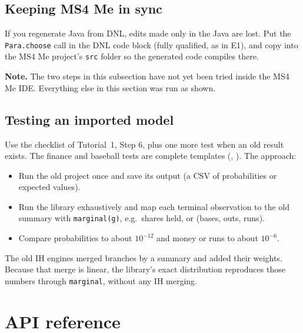 \documentclass[11pt]{article}
\newcommand{\code}[1]{\texttt{#1}}
\newcommand{\note}[1]{\par\noindent\colorbox{notebg}{\parbox{\dimexpr\linewidth-2\fboxsep}{\small\textbf{Note.} #1}}\par}
\begin{document}
\subsection{Keeping MS4 Me in sync}
If you regenerate Java from DNL, edits made only in the Java are lost. Put the \code{Para.choose} call in the DNL code
block (fully qualified, as in E1), and copy  into the MS4 Me project's \code{src} folder so
the generated code compiles there.

\note{The two steps in this subsection have not yet been tried inside the MS4 Me IDE. Everything else in this section
was run as shown.}

\subsection{Testing an imported model}
Use the checklist of Tutorial~1, Step 6, plus one more test when an old result exists. The finance and baseball tests
are complete templates (,
). The approach:
\begin{itemize}
\item Run the old project once and save its output (a CSV of probabilities or expected values).
\item Run the library exhaustively and map each terminal observation to the old summary with \code{marginal(g)}, e.g.\
  shares held, or (bases, outs, runs).
\item Compare probabilities to about $10^{-12}$ and money or runs to about $10^{-6}$.
\end{itemize}
The old IH engines merged branches by a summary and added their weights. Because that merge is linear, the library's
exact distribution reproduces those numbers through \code{marginal}, without any IH merging.

\section{API reference}
\end{document}
